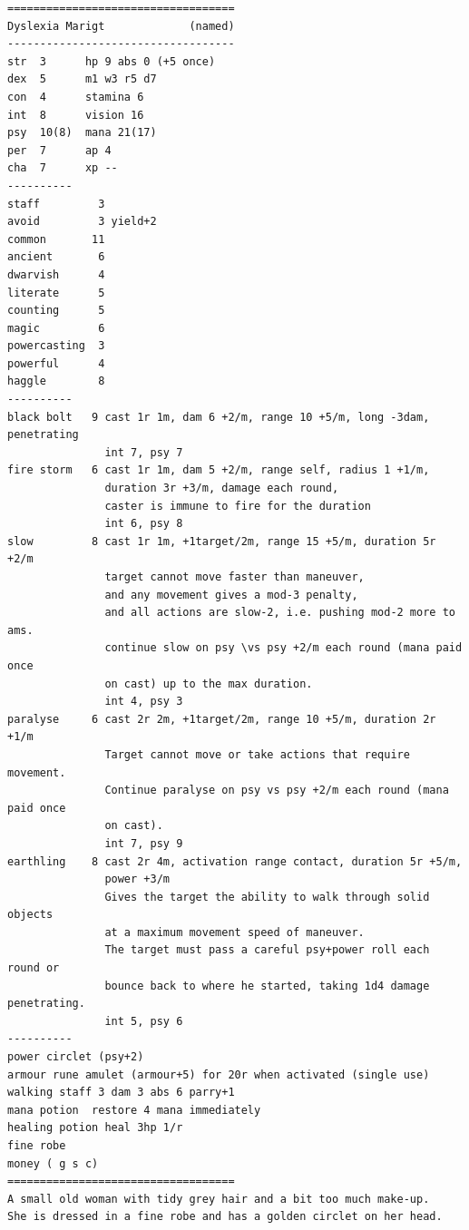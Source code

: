 \documentclass[11pt, twoside, titlepage, a4paper]{report}
\newcommand{\vs}{$\backslash\ $}  %
\begin{document}
\goodbreak \begin{samepage} \small \begin{verbatim}
===================================
Dyslexia Marigt             (named)
-----------------------------------
str  3      hp 9 abs 0 (+5 once)
dex  5      m1 w3 r5 d7
con  4      stamina 6
int  8      vision 16
psy  10(8)  mana 21(17)
per  7      ap 4
cha  7      xp --
----------
staff         3
avoid         3 yield+2
common       11
ancient       6
dwarvish      4
literate      5
counting      5
magic         6
powercasting  3
powerful      4
haggle        8
----------
black bolt   9 cast 1r 1m, dam 6 +2/m, range 10 +5/m, long -3dam, penetrating
               int 7, psy 7
fire storm   6 cast 1r 1m, dam 5 +2/m, range self, radius 1 +1/m,
               duration 3r +3/m, damage each round,
               caster is immune to fire for the duration
               int 6, psy 8
slow         8 cast 1r 1m, +1target/2m, range 15 +5/m, duration 5r +2/m
               target cannot move faster than maneuver,
               and any movement gives a mod-3 penalty,
               and all actions are slow-2, i.e. pushing mod-2 more to ams.
               continue slow on psy \vs psy +2/m each round (mana paid once
               on cast) up to the max duration.
               int 4, psy 3
paralyse     6 cast 2r 2m, +1target/2m, range 10 +5/m, duration 2r +1/m
               Target cannot move or take actions that require movement.
               Continue paralyse on psy vs psy +2/m each round (mana paid once
               on cast).
               int 7, psy 9
earthling    8 cast 2r 4m, activation range contact, duration 5r +5/m,
               power +3/m
               Gives the target the ability to walk through solid objects
               at a maximum movement speed of maneuver.
               The target must pass a careful psy+power roll each round or
               bounce back to where he started, taking 1d4 damage penetrating.
               int 5, psy 6
----------
power circlet (psy+2)
armour rune amulet (armour+5) for 20r when activated (single use)
walking staff 3 dam 3 abs 6 parry+1
mana potion  restore 4 mana immediately
healing potion heal 3hp 1/r
fine robe
money ( g s c)
===================================
A small old woman with tidy grey hair and a bit too much make-up.
She is dressed in a fine robe and has a golden circlet on her head.
\end{verbatim} \normalsize \end{samepage}

\
\end{document}
